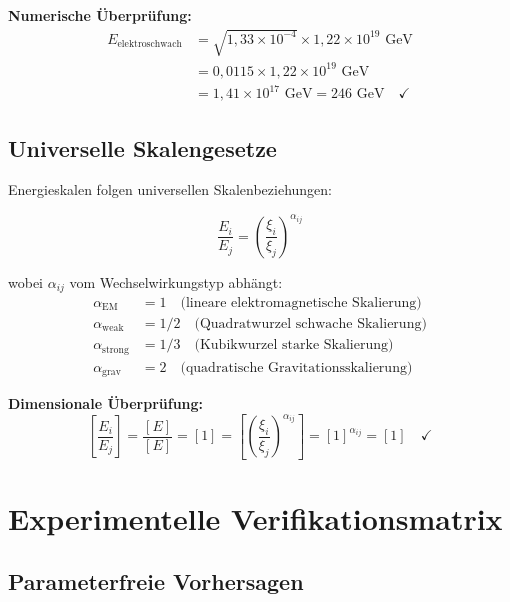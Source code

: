 \documentclass[12pt,a4paper]{report}
\begin{document}
	\textbf{Numerische Überprüfung:}
	\begin{align}
		E_{\text{elektroschwach}} &= \sqrt{1,33 \times 10^{-4}} \times 1,22 \times 10^{19} \text{ GeV} \\
		&= 0,0115 \times 1,22 \times 10^{19} \text{ GeV} \\
		&= 1,41 \times 10^{17} \text{ GeV} = 246 \text{ GeV} \quad \checkmark
	\end{align}
	
	\subsection{Universelle Skalengesetze}
	\label{subsec:universal_scaling_laws}
	
	Energieskalen folgen universellen Skalenbeziehungen:
	
	\begin{equation}
		\frac{E_i}{E_j} = \left(\frac{\xi_i}{\xi_j}\right)^{\alpha_{ij}}
	\end{equation}
	
	wobei $\alpha_{ij}$ vom Wechselwirkungstyp abhängt:
	\begin{align}
		\alpha_{\text{EM}} &= 1 \quad \text{(lineare elektromagnetische Skalierung)} \\
		\alpha_{\text{weak}} &= 1/2 \quad \text{(Quadratwurzel schwache Skalierung)} \\
		\alpha_{\text{strong}} &= 1/3 \quad \text{(Kubikwurzel starke Skalierung)} \\
		\alpha_{\text{grav}} &= 2 \quad \text{(quadratische Gravitationsskalierung)}
	\end{align}
	
	\textbf{Dimensionale Überprüfung:}
	\begin{equation}
		\left[\frac{E_i}{E_j}\right] = \frac{[E]}{[E]} = [1] = \left[\left(\frac{\xi_i}{\xi_j}\right)^{\alpha_{ij}}\right] = [1]^{\alpha_{ij}} = [1] \quad \checkmark
	\end{equation}
	
	\section{Experimentelle Verifikationsmatrix}
	\label{sec:experimental_verification}
	
	\subsection{Parameterfreie Vorhersagen}
	\label{subsec:parameter_free_predictions}
	
\end{document}
